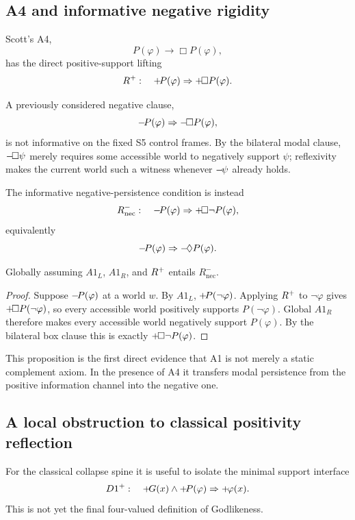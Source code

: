 \subsection{A4 and informative negative rigidity}

Scott's A4,
\[
  P(\varphi)\rightarrow\Box P(\varphi),
\]
has the direct positive-support lifting
\[
  R^{+}:\quad +\!P(\varphi)\Rightarrow+\!\Box P(\varphi).
\]

A previously considered negative clause,
\[
  -\!P(\varphi)\Rightarrow-\!\Box P(\varphi),
\]
is not informative on the fixed S5 control frames. By the bilateral modal clause, \(-\!\Box\psi\) merely requires some accessible world to negatively support \(\psi\); reflexivity makes the current world such a witness whenever \(-\!\psi\) already holds.

The informative negative-persistence condition is instead
\[
  R^-_{\mathrm{nec}}:\quad
  -\!P(\varphi)\Rightarrow+\!\Box\neg P(\varphi),
\]
equivalently
\[
  -\!P(\varphi)\Rightarrow-\!\Diamond P(\varphi).
\]

\begin{proposition}
Globally assuming \(A1_L\), \(A1_R\), and \(R^{+}\) entails \(R^-_{\mathrm{nec}}\).
\end{proposition}
\begin{proof}
Suppose \(-\!P(\varphi)\) at a world \(w\). By \(A1_L\), \(+\!P(\neg\varphi)\). Applying \(R^{+}\) to \(\neg\varphi\) gives \(+\!\Box P(\neg\varphi)\), so every accessible world positively supports \(P(\neg\varphi)\). Global \(A1_R\) therefore makes every accessible world negatively support \(P(\varphi)\). By the bilateral box clause this is exactly \(+\!\Box\neg P(\varphi)\).
\end{proof}

This proposition is the first direct evidence that A1 is not merely a static complement axiom. In the presence of A4 it transfers modal persistence from the positive information channel into the negative one.

\subsection{A local obstruction to classical positivity reflection}

For the classical collapse spine it is useful to isolate the minimal support interface
\[
  D1^+:\quad +\!G(x)\land+\!P(\varphi)\Rightarrow+\!\varphi(x).
\]
This is not yet the final four-valued definition of Godlikeness.

